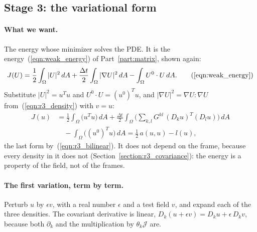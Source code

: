 \subsection{Stage 3: the variational form}
\label{section:r3_stage3}

\paragraph{What we want.} The energy whose minimizer solves the PDE. It is the energy~(\ref{eqn:weak_energy}) of Part~\ref{part:matrix}, shown again:
\begin{equation*}
J(U) = \frac12 \int_\Omega |U|^2\, dA + \frac{\Delta t}{2} \int_\Omega |\nabla U|^2\, dA - \int_\Omega U^0 \cdot U\, dA . \tag{\ref{eqn:weak_energy}}
\end{equation*}
Substitute $|U|^2 = u^Tu$ and $U^0\cdot U = (u^0)^Tu$, and $|\nabla U|^2 = \nabla U : \nabla U$ from~(\ref{eqn:r3_density}) with $v = u$:
\begin{equation}
\label{eqn:r3_energy}
\begin{aligned}
J(u) &= \frac12\int_\Omega \big(u^Tu\big)\, dA + \frac{\Delta t}{2}\int_\Omega \Big(\sum_{k,l} G^{kl}\,(D_ku)^T(D_lu)\Big)\, dA \\
&\quad - \int_\Omega \big((u^0)^Tu\big)\, dA = \frac12\, a(u, u) - l(u) ,
\end{aligned}
\end{equation}
the last form by~(\ref{eqn:r3_bilinear}). It does not depend on the frame, because every density in it does not (Section~\ref{section:r3_covariance}): the energy is a property of the field, not of the frames.

\paragraph{The first variation, term by term.} Perturb $u$ by $\epsilon v$, with a real number $\epsilon$ and a test field $v$, and expand each of the three densities. The covariant derivative is linear, $D_k(u + \epsilon v) = D_ku + \epsilon\, D_kv$, because both $\partial_k$ and the multiplication by $\theta_k\mathcal J$ are.

